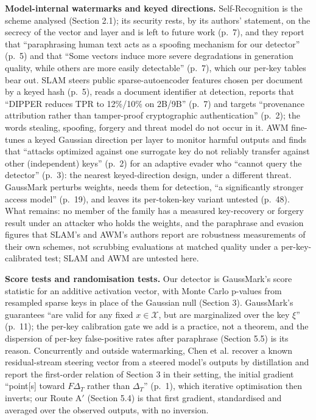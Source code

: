 \documentclass[11pt,letterpaper]{article}
\begin{document}
\textbf{Model-internal watermarks and keyed directions.} Self-Recognition \citep{ardoin2026selfrecognition} is the scheme analysed (Section 2.1); its security rests, by its authors' statement, on the secrecy of the vector and layer and is left to future work (p.~7), and they report that ``paraphrasing human text acts as a spoofing mechanism for our detector'' (p.~5) and that ``Some vectors induce more severe degradations in generation quality, while others are more easily detectable'' (p.~7), which our per-key tables bear out. SLAM \citep{harelcanada2026slam} steers public sparse-autoencoder features chosen per document by a keyed hash (p.~5), reads a document identifier at detection, reports that ``DIPPER reduces TPR to 12\%/10\% on 2B/9B'' (p.~7) and targets ``provenance attribution rather than tamper-proof cryptographic authentication'' (p.~2); the words stealing, spoofing, forgery and threat model do not occur in it. AWM \citep{aremu2026awm} fine-tunes a keyed Gaussian direction per layer to monitor harmful outputs and finds that ``attacks optimized against one surrogate key do not reliably transfer against other (independent) keys'' (p.~2) for an adaptive evader who ``cannot query the detector'' (p.~3): the nearest keyed-direction design, under a different threat. GaussMark \citep{block2025gaussmark} perturbs weights, needs them for detection, ``a significantly stronger access model'' (p.~19), and leaves its per-token-key variant untested (p.~48). What remains: no member of the family has a measured key-recovery or forgery result under an attacker who holds the weights, and the paraphrase and evasion figures that SLAM's and AWM's authors report are robustness measurements of their own schemes, not scrubbing evaluations at matched quality under a per-key-calibrated test; SLAM and AWM are untested here.

\textbf{Score tests and randomisation tests.} Our detector is GaussMark's score statistic \citep{block2025gaussmark, rao1948score} for an additive activation vector, with Monte Carlo p-values \citep{phipson2010permutation} from resampled sparse keys in place of the Gaussian null (Section 3). GaussMark's guarantees ``are valid for any fixed \(x \in \mathcal{X}\), but are marginalized over the key \(\xi\)'' (p.~11); the per-key calibration gate we add is a practice, not a theorem, and the dispersion of per-key false-positive rates after paraphrase (Section 5.5) is its reason. Concurrently and outside watermarking, Chen et al. \citep{chen2026subliminal} recover a known residual-stream steering vector from a steered model's outputs by distillation and report the first-order relation of Section 3 in their setting, the initial gradient ``point{[}s{]} toward \(F\Delta_T\) rather than \(\Delta_T\)'' (p.~1), which iterative optimisation then inverts; our Route A\ensuremath{'} (Section 5.4) is that first gradient, standardised and averaged over the observed outputs, with no inversion.
\end{document}
